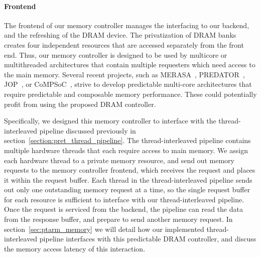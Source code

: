 \paragraph{Frontend}
The frontend of our memory controller manages the interfacing to our backend, and the refreshing of the DRAM device.
The privatization of DRAM banks creates four independent resources that are accessed separately from the front end.
Thus, our memory controller is designed to be used by multicore or multithreaded architectures that contain multiple requesters which need access to the main memory.
Several recent projects, such as MERASA~\cite{Ungerer10}, PREDATOR~\cite{Akesson2007CODES}, JOP~\cite{Schoeberl2008265}, or CoMPSoC~\cite{Hansson09}, strive to develop predictable multi-core architectures that require predictable and composable memory performance.
These could potentially profit from using the proposed DRAM controller.

Specifically, we designed this memory controller to interface with the thread-interleaved pipeline discussed previously in section~\ref{section:pret_thread_pipeline}.
The thread-interleaved pipeline contains multiple hardware threads that each require access to main memory. 
We assign each hardware thread to a private memory resource, and send out memory requests to the memory controller frontend, which receives the request and places it within the request buffer.
Each thread in the thread-interleaved pipeline sends out only one outstanding memory request at a time, so the single request buffer for each resource is sufficient to interface with our thread-interleaved pipeline.
Once the request is serviced from the backend, the pipeline can read the data from the response buffer, and prepare to send another memory request.    
In section~\ref{sec:ptarm_memory} we will detail how our implemented thread-interleaved pipeline interfaces with this predictable DRAM controller, and discuss the memory access latency of this interaction.

